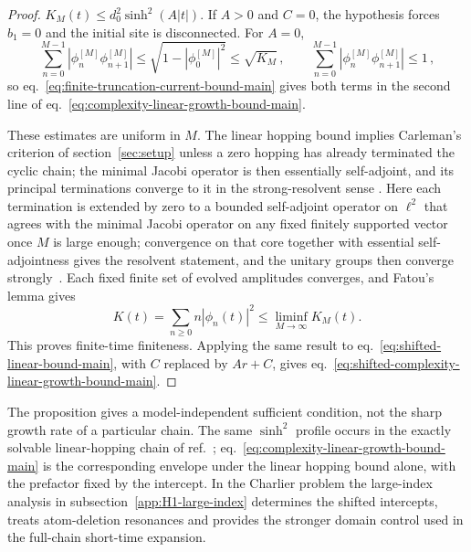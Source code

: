 \documentclass[a4paper,11pt]{article}
\theoremstyle{definition}
\theoremstyle{remark}
\begin{document}
\begin{proof}
$K_M(t)\le d_0^2\sinh^2(A|t|)$.  If $A>0$ and $C=0$, the hypothesis
forces $b_1=0$ and the initial site is disconnected.  For $A=0$,
\begin{equation}
   \sum_{n=0}^{M-1}|\phi_n^{[M]}\phi_{n+1}^{[M]}|
   \le\sqrt{1-|\phi_0^{[M]}|^2}
   \le\sqrt{K_M}\,,
   \qquad
   \sum_{n=0}^{M-1}|\phi_n^{[M]}\phi_{n+1}^{[M]}|\le1\,,
\end{equation}
so eq.~\eqref{eq:finite-truncation-current-bound-main} gives both terms
in the second line of eq.~\eqref{eq:complexity-linear-growth-bound-main}.

These estimates are uniform in $M$.  The linear hopping bound implies Carleman's criterion of section~\ref{sec:setup} unless a zero hopping has already terminated the cyclic chain; the minimal Jacobi operator is then essentially self-adjoint, and its principal terminations converge to it in the strong-resolvent sense \cite{SimonMomentProblem1998}. Here each termination is extended by zero to a bounded self-adjoint operator on $\ell^2$ that agrees with the minimal Jacobi operator on any fixed finitely supported vector once $M$ is large enough; convergence on that core together with essential self-adjointness gives the resolvent statement, and the unitary groups then converge strongly~\cite{ReedSimonI}.  Each fixed
finite set of evolved amplitudes converges, and Fatou's lemma \cite{Folland1999} gives
\begin{equation}
   K(t)=\sum_{n\ge0}n|\phi_n(t)|^2
   \le\liminf_{M\to\infty}K_M(t).
\end{equation}
This proves finite-time finiteness.  Applying the same result to
eq.~\eqref{eq:shifted-linear-bound-main}, with $C$ replaced by $Ar+C$,
gives eq.~\eqref{eq:shifted-complexity-linear-growth-bound-main}.
\end{proof}

The proposition gives a model-independent sufficient condition, not the
sharp growth rate of a particular chain. 
The same $\sinh^2$ profile occurs in the exactly solvable linear-hopping chain of ref.~\cite{Parker2019}; eq.~\eqref{eq:complexity-linear-growth-bound-main} is the corresponding envelope under the linear hopping bound alone, with the prefactor fixed by the intercept.  In the Charlier problem the
large-index analysis in subsection~\ref{app:H1-large-index} determines
the shifted intercepts, treats atom-deletion resonances and provides the
stronger domain control used in the full-chain short-time expansion. 
\end{document}
